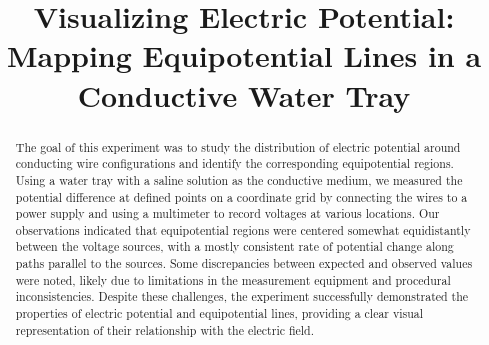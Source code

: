 \documentclass[conference]{IEEEtran}
\begin{document}
\title{Visualizing Electric Potential: Mapping Equipotential Lines in a Conductive Water Tray}

\author{
\and
{}
\and
{}
\and
{}
\and
{}
\and
{}
\and
{}
}

\maketitle

\begin{abstract}
The goal of this experiment was to study the distribution of electric potential around conducting wire configurations and identify the corresponding equipotential regions. Using a water tray with a saline solution as the conductive medium, we measured the potential difference at defined points on a coordinate grid by connecting the wires to a power supply and using a multimeter to record voltages at various locations. Our observations indicated that equipotential regions were centered somewhat equidistantly between the voltage sources, with a mostly consistent rate of potential change along paths parallel to the sources. Some discrepancies between expected and observed values were noted, likely due to limitations in the measurement equipment and procedural inconsistencies. Despite these challenges, the experiment successfully demonstrated the properties of electric potential and equipotential lines, providing a clear visual representation of their relationship with the electric field.
\end{abstract}
\end{document}
